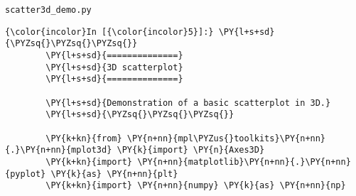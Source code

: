     \texttt{scatter3d\_demo.py}

    \begin{Verbatim}[commandchars=\\\{\}]
{\color{incolor}In [{\color{incolor}5}]:} \PY{l+s+sd}{\PYZsq{}\PYZsq{}\PYZsq{}}
        \PY{l+s+sd}{==============}
        \PY{l+s+sd}{3D scatterplot}
        \PY{l+s+sd}{==============}
        
        \PY{l+s+sd}{Demonstration of a basic scatterplot in 3D.}
        \PY{l+s+sd}{\PYZsq{}\PYZsq{}\PYZsq{}}
        
        \PY{k+kn}{from} \PY{n+nn}{mpl\PYZus{}toolkits}\PY{n+nn}{.}\PY{n+nn}{mplot3d} \PY{k}{import} \PY{n}{Axes3D}
        \PY{k+kn}{import} \PY{n+nn}{matplotlib}\PY{n+nn}{.}\PY{n+nn}{pyplot} \PY{k}{as} \PY{n+nn}{plt}
        \PY{k+kn}{import} \PY{n+nn}{numpy} \PY{k}{as} \PY{n+nn}{np}
\end{Verbatim}


